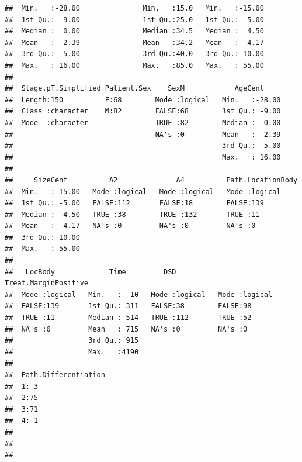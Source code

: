 \documentclass{article}\usepackage[]{graphicx}\usepackage[]{color}
\makeatletter
\newenvironment{kframe}{%
 \def\at@end@of@kframe{}%
 \ifinner\ifhmode%
  \def\at@end@of@kframe{\end{minipage}}%
  \begin{minipage}{\columnwidth}%
 \fi\fi%
 \def\FrameCommand##1{\hskip\@totalleftmargin \hskip-\fboxsep
 \colorbox{shadecolor}{##1}\hskip-\fboxsep
     \hskip-\linewidth \hskip-\@totalleftmargin \hskip\columnwidth}%
 \MakeFramed {\advance\hsize-\width
   \@totalleftmargin\z@ \linewidth\hsize
   \@setminipage}}%
 {\par\unskip\endMakeFramed%
 \at@end@of@kframe}
\newenvironment{knitrout}{}{} %
\makeatother
\begin{document}
\begin{knitrout}
\begin{kframe}
\begin{verbatim}
##  Min.   :-28.00               Min.   :15.0   Min.   :-15.00  
##  1st Qu.: -9.00               1st Qu.:25.0   1st Qu.: -5.00  
##  Median :  0.00               Median :34.5   Median :  4.50  
##  Mean   : -2.39               Mean   :34.2   Mean   :  4.17  
##  3rd Qu.:  5.00               3rd Qu.:40.0   3rd Qu.: 10.00  
##  Max.   : 16.00               Max.   :85.0   Max.   : 55.00  
##                                                              
##  Stage.pT.Simplified Patient.Sex    SexM            AgeCent      
##  Length:150          F:68        Mode :logical   Min.   :-28.00  
##  Class :character    M:82        FALSE:68        1st Qu.: -9.00  
##  Mode  :character                TRUE :82        Median :  0.00  
##                                  NA's :0         Mean   : -2.39  
##                                                  3rd Qu.:  5.00  
##                                                  Max.   : 16.00  
##                                                                  
##     SizeCent          A2              A4          Path.LocationBody
##  Min.   :-15.00   Mode :logical   Mode :logical   Mode :logical    
##  1st Qu.: -5.00   FALSE:112       FALSE:18        FALSE:139        
##  Median :  4.50   TRUE :38        TRUE :132       TRUE :11         
##  Mean   :  4.17   NA's :0         NA's :0         NA's :0          
##  3rd Qu.: 10.00                                                    
##  Max.   : 55.00                                                    
##                                                                    
##   LocBody             Time         DSD          Treat.MarginPositive
##  Mode :logical   Min.   :  10   Mode :logical   Mode :logical       
##  FALSE:139       1st Qu.: 311   FALSE:38        FALSE:98            
##  TRUE :11        Median : 514   TRUE :112       TRUE :52            
##  NA's :0         Mean   : 715   NA's :0         NA's :0             
##                  3rd Qu.: 915                                       
##                  Max.   :4190                                       
##                                                                     
##  Path.Differentiation
##  1: 3                
##  2:75                
##  3:71                
##  4: 1                
##                      
##                      
## 
\end{verbatim}
\begin{alltt}

\end{alltt}
\end{kframe}
\end{knitrout}
\end{document}
